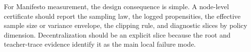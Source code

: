 For Manifesto measurement, the design consequence is simple. A node-level
certificate should report the sampling law, the logged propensities, the
effective sample size or variance envelope, the clipping rule, and diagnostic
slices by policy dimension. Decentralization should be an explicit slice
because the root and teacher-trace evidence identify it as the main local
failure mode.
